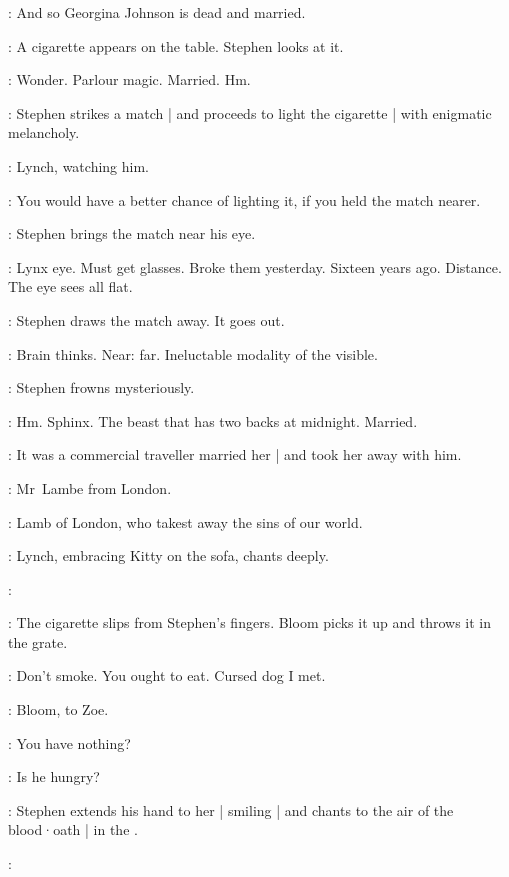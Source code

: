 \Stephen:
And so Georgina Johnson is dead and married.

:
A cigarette appears on the table.
Stephen looks at it.

\Stephen:
Wonder.
Parlour magic.
Married.
Hm.

:
Stephen strikes a match |
and proceeds to light the cigarette |
with enigmatic melancholy.

:
Lynch,
watching him.

\Lynch:
You would have a better chance of lighting it,
if you held the match nearer.

:
Stephen brings the match near his eye.

\Stephen:
Lynx eye.
Must get glasses.
Broke them yesterday.
Sixteen years ago.
Distance.
The eye sees all flat.

:
Stephen draws the match away.
It goes out.

\Stephen:
Brain thinks.
Near:
far.
Ineluctable modality of the visible.

:
Stephen frowns mysteriously.

\Stephen:
Hm.
Sphinx.
The beast that has two backs at midnight.
Married.

\Zoe:
It was a commercial traveller married her |
and took her away with him.

\Florry:
Mr~Lambe from London.

\Stephen:
Lamb of London,
who takest away the sins of our world.

:
Lynch,
embracing Kitty on the sofa,
chants deeply.

\Lynch:

:
The cigarette slips from Stephen's fingers.
Bloom picks it up and throws it in the grate.

\Bloom:
Don't smoke.
You ought to eat.
Cursed dog I met.

:
Bloom, to Zoe.

\Bloom:
You have nothing?

\Zoe:
Is he hungry?

:
Stephen extends his hand to her |
smiling |
and chants to the air of the blood·oath |
in the .

\Stephen:
\begin{verse}
\end{verse}

